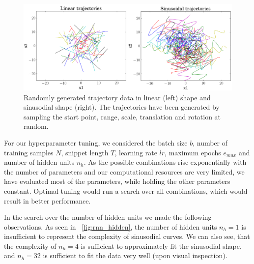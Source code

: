 \begin{figure}
	\centering
	\includegraphics [trim=0 0 0 0, clip, angle=0, width=1.0\columnwidth,
	keepaspectratio]{figures/lin_sin_traj}
	\caption{Randomly generated trajectory data in linear (left) shape and sinusodial shape (right). The trajectories have been generated by sampling the start point, range, scale, translation and rotation at random.} 
	\label{fig:lin_sin_traj} 
\end{figure}
For our hyperparameter tuning, we considered the batch size $b$, number of training samples $N$, snippet length $T$, learning rate $lr$, maximum epochs $e_{max}$ and number of hidden units $n_h$. 
As the possible combinations rise exponentially with the number of parameters and our computational resources are very limited, we have evaluated most of the parameters, while holding the other parameters constant.
Optimal tuning would run a search over all combinations, which would result in better performance.

In the search over the number of hidden units we made the following observations.
As seen in ~\cref{fig:rnn_hidden}, the number of hidden units $n_h = 1$ is insufficient to represent the complexity of sinusodial curves.
We can also see, that the complexity of $n_h=4$ is sufficient to approximately fit the sinusodial shape, and $n_h=32$ is sufficient to fit the data very well (upon visual inspection).


